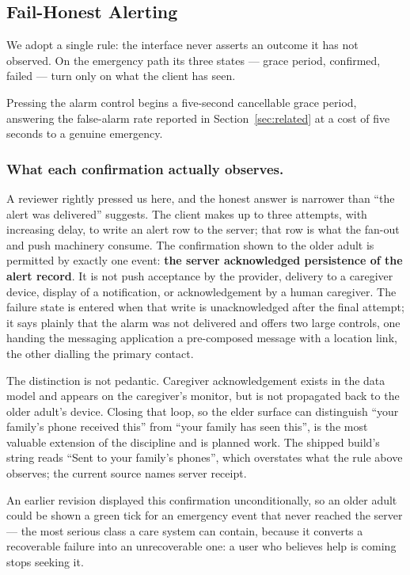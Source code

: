 \documentclass[runningheads,a4paper]{llncs}
\begin{document}
\subsection{Fail-Honest Alerting}
\label{sec:honest}

We adopt a single rule: the interface never asserts an outcome it has not observed. On the
emergency path its three states --- grace period, confirmed, failed --- turn only on what
the client has seen.

Pressing the alarm control begins a five-second cancellable grace period, answering the
false-alarm rate reported in Section~\ref{sec:related} at a cost of five seconds to a
genuine emergency.

\subsubsection{What each confirmation actually observes.}
A reviewer rightly pressed us here, and the honest answer is narrower than ``the alert was
delivered'' suggests. The client makes up to three attempts, with increasing delay, to write
an alert row to the server; that row is what the fan-out and push machinery consume. The
confirmation shown to the older adult is permitted by exactly one event: \textbf{the server
acknowledged persistence of the alert record}. It is not push acceptance by the provider,
delivery to a caregiver device, display of a notification, or acknowledgement by a human
caregiver. The failure state is entered when that write is unacknowledged after the final
attempt; it says plainly that the alarm was not delivered and offers two large controls,
one handing the messaging application a pre-composed message with a location link, the
other dialling the primary contact.

The distinction is not pedantic. Caregiver acknowledgement exists in the data model and
appears on the caregiver's monitor, but is not propagated back to the older adult's device.
Closing that loop, so the elder surface can distinguish ``your family's phone received
this'' from ``your family has seen this'', is the most valuable extension of the discipline
and is planned work. The shipped build's string reads ``Sent to your family's phones'',
which overstates what the rule above observes; the current source names server receipt.

An earlier revision displayed this confirmation unconditionally, so an older adult could be
shown a green tick for an emergency event that never reached the server --- the most
serious class a care system can contain, because it converts a recoverable failure into an
unrecoverable one: a user who believes help is coming stops seeking it.
\end{document}
